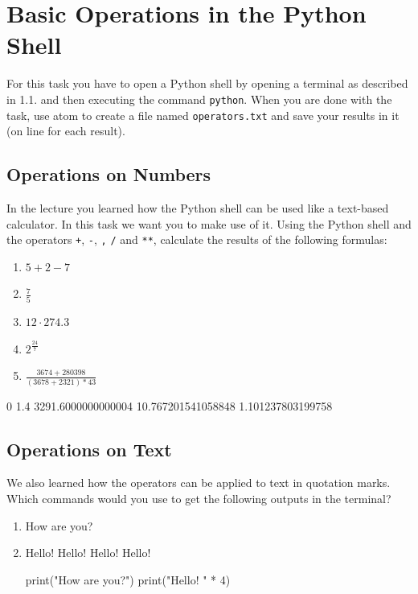 \section{Basic Operations in the Python Shell}

For this task you have to open a Python shell by opening a terminal as described in 1.1. and then executing the command \texttt{python}. When you are done with the task, use atom to create a file named \texttt{operators.txt} and save your results in it (on line for each result).

\subsection{Operations on Numbers}

In the lecture you learned how the Python shell can be used like a text-based calculator. In this task we want you to make use of it. Using the Python shell and the operators \texttt+, \texttt-, \texttt*, \texttt/ and \texttt{**}, calculate the results of the following formulas:

\begin{enumerate}

\item $5 + 2 - 7$
\item $\frac{7}{5}$
\item $12 \cdot 274.3$
\item $2^{\frac{24}{7}}$
\item $\frac{3674 + 280398}{(3678 + 2321) * 43}$

\end{enumerate}

\begin{solution}
    \begin{outputcode}
0
1.4
3291.6000000000004
10.767201541058848
1.101237803199758
    \end{outputcode}
\end{solution}

\subsection{Operations on Text}

We also learned how the operators can be applied to text in quotation marks.
Which commands would you use to get the following outputs in the terminal?

\begin{enumerate}

\item How are you?
\item Hello! Hello! Hello! Hello!

\begin{solution}
    \begin{pythoncode}
print("How are you?")
print("Hello! " * 4)
    \end{pythoncode}
\end{solution}

\end{enumerate}

